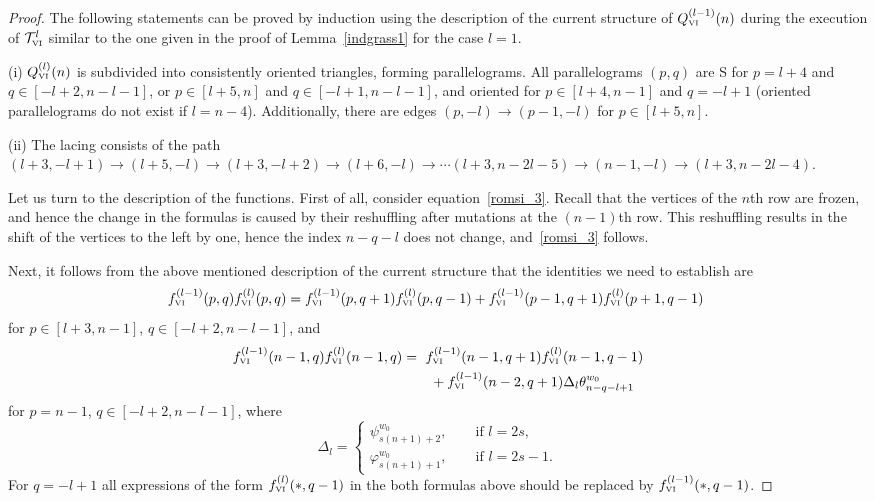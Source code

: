 \documentclass{amsart}
\theoremstyle{definition}
\theoremstyle{remark}
\numberwithin{equation}{section}
\numberwithin{theorem}{section}
\begin{document}
\begin{proof}
 
The following statements can be proved
by induction using the description of the current structure
of $Q^{(l-1)}_{\mbox{\tiny\rm VI}}(n)$ during the execution of ${{\mathcal T}}^l_{\mbox{\tiny\rm VI}}$ similar to the one given in
the proof of Lemma~\ref{indgrass1} for the case $l=1$. 

(i) $Q^{(l)}_{\mbox{\tiny\rm VI}}(n)$ is subdivided into consistently oriented triangles,
forming parallelograms. 
All parallelograms  $(p,q)$ are S for $p=l+4$ and $q\in [-l+2,n-l-1]$, or $p\in [l+5,n]$ and $q\in [-l+1,n-l-1]$, 
and oriented for $p\in [l+4,n-1]$ and $q=-l+1$ (oriented parallelograms do not exist if $l=n-4$).
Additionally, there are edges $(p, -l ) \to (p-1, - l)$ for $p\in [l+5,n]$.

(ii) The lacing 
consists of the path $(l+3, -l+1) \to (l+5, -l) \to 
(l+3, -l+2) \to (l+6, -l) \to \cdots (l+3, n -2l - 5) \to (n-1, -l) \to (l+3, n - 2l -4)$. 
 
Let us turn to the description of the functions.  
First of all, consider equation~\eqref{romsi_3}. Recall that
the vertices of the $n$th row are frozen, and hence the change in the formulas is caused by 
their reshuffling after mutations at the $(n-1)$th row. This reshuffling results in the shift of the 
vertices to the left by one, hence the index $n-q-l$ does not change, and~\eqref{romsi_3} follows.

Next, it follows from the above mentioned description of the current structure that the 
identities we need to establish are
 \begin{equation*}
f^{(l-1)}_{\mbox{\tiny\rm VI}} (p,q) f^{(l)}_{\mbox{\tiny\rm VI}} (p,q) = f^{(l-1)}_{\mbox{\tiny\rm VI}} (p,q+1) f^{(l)}_{\mbox{\tiny\rm VI}} (p,q-1) + f^{(l-1)}_{\mbox{\tiny\rm VI}} (p-1,q+1) f^{(l)}_{\mbox{\tiny\rm VI}} (p+1,q-1)\ 
\end{equation*}
 for $p\in [l+3, n-1]$, $q\in [-l+2, n-l-1]$, and
 \begin{align*}
f^{(l-1)}_{\mbox{\tiny\rm VI}} (n-1,q) f^{(l)}_{\mbox{\tiny\rm VI}} (n-1,q)&=\ f^{(l-1)}_{\mbox{\tiny\rm VI}} (n-1,q+1) f^{(l)}_{\mbox{\tiny\rm VI}} (n-1,q-1)\\ &\qquad+ f^{(l-1)}_{\mbox{\tiny\rm VI}} (n-2,q+1)\Delta_l  {{\theta}}^{w_0}_{n-q-l+1}\ 
\end{align*}
for $p=n-1$,  $q\in [-l+2, n-l-1]$, where
$$
\Delta_l=\begin{cases}
{{\psi}}^{w_0}_{s(n+1) + 2}, \qquad \text{if $l=2s$},\\
{{\varphi}}^{w_0}_{s(n+1) + 1}, \qquad \text{if $l=2s-1$}.
\end{cases}
$$ 
For $q=-l+1$ all expressions of the form $f^{(l)}_{\mbox{\tiny\rm VI}}(*,q-1)$
in the both formulas above should be replaced by $f^{(l-1)}_{\mbox{\tiny\rm VI}}(*,q-1)$.


\end{proof}
\end{document}
